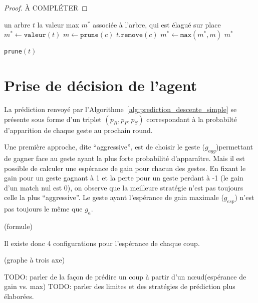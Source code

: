 \documentclass[10pt,a4paper]{article}
\theoremstyle{plain} %
\theoremstyle{definition} %
\theoremstyle{remark} %
\def\noeud{n\oe ud\xspace}
\begin{document}
\begin{proof}
À COMPLÉTER
\end{proof}

\begin{algorithm}
\begin{algorithmic}[1]
\REQUIRE un arbre $t$
\ENSURE la valeur max $m^*$ associée à l'arbre, qui est élagué sur place
\STATE $m^* \leftarrow \texttt{valeur}(t)$
  \STATE $m \leftarrow \texttt{prune}\left (c\right )$
    \STATE $t.\texttt{remove}\left (c\right )$
  \ELSE
    \STATE $m^* \leftarrow \texttt{max}\left (m^*, m\right )$
  \ENDIF
\ENDFOR
\RETURN $m^*$
\end{algorithmic}
\caption{\texttt{prune}$\left (t\right )$}
\label{alg:elagage_confiance}
\end{algorithm}

\section{Prise de décision de l'agent}
La prédiction renvoyé par l'Algorithme~\ref{alg:prediction_descente_simple} se présente sous forme d'un triplet $(p_R, p_P, p_S)$ correspondant à la probabilté d'apparition de chaque geste au prochain round.

Une première approche, dite ``aggressive'', est de choisir le geste ($g_{agg}$)permettant de gagner face au geste ayant la plus forte probabilité d'apparaître.
Mais il est possible de calculer une espérance de gain pour chacun des gestes.
En fixant le gain pour un geste gagnant à 1 et la perte pour un geste perdant à -1 (le gain d'un match nul est 0), on observe que la meilleure stratégie n'est pas toujours celle la plus ``aggressive''.
Le geste ayant l'espérance de gain maximale ($g_{esp}$) n'est pas toujours le même que $g_a$.

(formule)

Il existe donc 4 configurations pour l'espérance de chaque coup.

(graphe à trois axe)


TODO: parler de la façon de prédire un coup à partir d'un \noeud (espérance de gain vs. max)
TODO: parler des limites et des stratégies de prédiction plus élaborées.


\appendix
\end{document}
